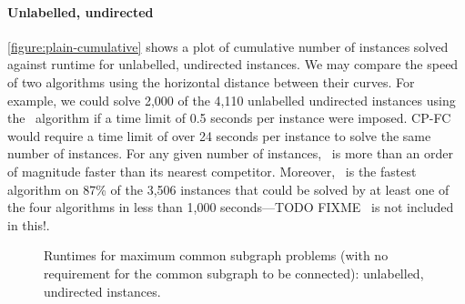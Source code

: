 \paragraph{Unlabelled, undirected}
\cref{figure:plain-cumulative} shows a plot of cumulative 
number of instances solved against runtime for unlabelled, undirected
instances.  We may compare
the speed of two algorithms using the horizontal distance between their curves.
For example, we could solve 2,000 of the 4,110 unlabelled undirected instances
using the \McSplit\ algorithm if a time limit of 0.5 seconds per instance were
imposed.  CP-FC would require a time limit of over 24
seconds per instance to solve the same number of instances.  For any given
number of instances, \McSplit\ is more than an order of magnitude
faster than its nearest competitor.  Moreover, \McSplit\ is the fastest algorithm
on 87\% of the 3,506 instances that
could be solved by at least one of the four algorithms in less than
1,000 seconds---TODO FIXME \kDown\ is not included in this!.

\begin{figure}[htb!]
    \centering
    \par\bigskip
    \caption{Runtimes for maximum
    common subgraph problems (with no requirement for the common subgraph
    to be connected): unlabelled, undirected instances.}\label{figure:mcs-cumulative-plain-not-connected}
\end{figure}

